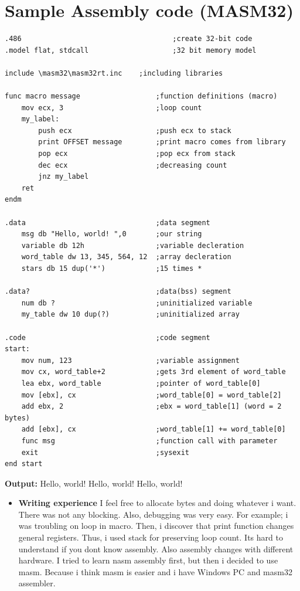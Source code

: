 \documentclass[11pt]{article}
\begin{document}
\section{Sample Assembly code (MASM32)}
\begin{lstlisting}
.486									;create 32-bit code
.model flat, stdcall					;32 bit memory model

include \masm32\masm32rt.inc	;including libraries

func macro message					;function definitions (macro)
	mov ecx, 3						;loop count
	my_label:
		push ecx					;push ecx to stack
		print OFFSET message		;print macro comes from library
		pop ecx						;pop ecx from stack
		dec ecx						;decreasing count
		jnz my_label
	ret
endm

.data								;data segment
	msg db "Hello, world! ",0		;our string
	variable db 12h					;variable decleration
	word_table dw 13, 345, 564, 12	;array decleration
	stars db 15 dup('*')			;15 times *

.data?								;data(bss) segment
	num db ?						;uninitialized variable
	my_table dw 10 dup(?)			;uninitialized array

.code								;code segment
start:
	mov num, 123					;variable assignment
	mov cx, word_table+2			;gets 3rd element of word_table
	lea ebx, word_table				;pointer of word_table[0]
	mov [ebx], cx					;word_table[0] = word_table[2]
	add ebx, 2						;ebx = word_table[1] (word = 2 bytes)
	add [ebx], cx					;word_table[1] += word_table[0]
	func msg						;function call with parameter
	exit							;sysexit
end start
\end{lstlisting}
{\bf Output:} Hello, world! Hello, world! Hello, world! 
\newpage
\begin{itemize}
	\item{{\bf Writing experience}}
	 I feel free to allocate bytes and doing whatever i want. There was not any blocking. Also, debugging was very easy. For example; i was troubling on loop in macro. Then, i discover that print function changes general registers. Thus, i used stack for preserving loop count.
	 Its hard to understand if you dont know assembly. Also assembly changes with different hardware. I tried to learn nasm assembly first, but then i decided to use masm. Because i think masm is easier and i have Windows PC and masm32 assembler.
\end{itemize}
\end{document}
